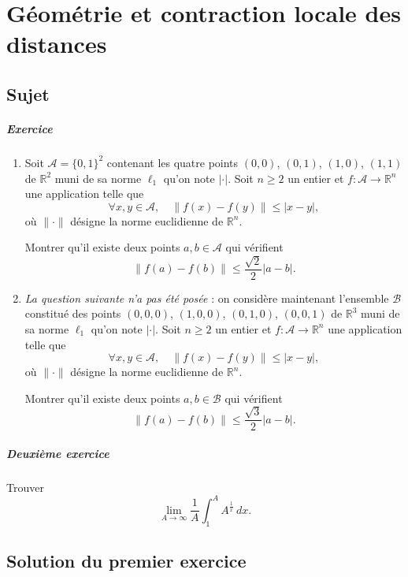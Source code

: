 \chapter{Géométrie et contraction locale des distances}

\section{Sujet}

\paragraph{Exercice}
\begin{enumerate}[label=(\arabic*)]
\item
Soit $\mathcal A = \{0,1\}^2$ contenant les quatre points $(0,0)$, $(0,1)$, $(1,0)$, $(1,1)$ de $\mathbb{R}^2$ muni de sa norme $\ell_1$ qu'on note $\lvert\cdot\rvert$. 
Soit $n\geqslant 2$ un entier et $f : \mathcal A \to \mathbb{R}^n$ une application telle que 
\[\forall x,y\in \mathcal A,\quad \lVert f(x) - f(y) \rVert \leqslant \lvert x - y \rvert,\]
où $\lVert \cdot \rVert$ désigne la norme euclidienne de $\mathbb{R}^n$.

Montrer qu'il existe deux points $a,b\in\mathcal A$ qui vérifient
\[\lVert f(a) - f(b)\rVert \leqslant \frac{\sqrt 2} 2 \lvert a - b\rvert.\]
\item 
\textit{La question suivante n'a pas été posée} : 
on considère maintenant l'ensemble $\mathcal B$ constitué des points $(0,0,0)$, $(1,0,0)$, $(0,1,0)$, $(0,0,1)$ de $\mathbb{R}^3$ muni de sa norme $\ell_1$ qu'on note $\lvert\cdot\rvert$. Soit $n\geqslant 2$ un entier et $f : \mathcal A \to \mathbb{R}^n$ une application telle que 
\[\forall x,y\in\mathcal A, \quad \lVert f(x) - f(y) \rVert \leqslant \lvert x - y \rvert,\]
où $\lVert\cdot\rVert$ désigne la norme euclidienne de $\mathbb{R}^n$.

Montrer qu'il existe deux points $a,b\in\mathcal B$ qui vérifient 
\[\lVert f(a) - f(b)\rVert \leqslant \frac{\sqrt 3} 2 \lvert a - b\rvert.\]
\end{enumerate}

\paragraph{Deuxième exercice}
Trouver
\[
\lim_{A\to\infty} \frac1A\int_1^A A^{\frac1x}\,dx.
\]

\section{Solution du premier exercice}

